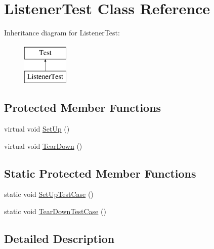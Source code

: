 \hypertarget{classtesting_1_1internal_1_1ListenerTest}{\section{\-Listener\-Test \-Class \-Reference}
\label{de/d9a/classtesting_1_1internal_1_1ListenerTest}
}
\-Inheritance diagram for \-Listener\-Test\-:\begin{figure}[H]
\begin{center}
\leavevmode
\includegraphics[height=2.000000cm]{de/d9a/classtesting_1_1internal_1_1ListenerTest}
\end{center}
\end{figure}
\subsection*{\-Protected \-Member \-Functions}
\begin{DoxyCompactItemize}
\item 
virtual void \hyperlink{classtesting_1_1internal_1_1ListenerTest_a901706a587f9ae84df8b2395fbe759cb}{\-Set\-Up} ()
\item 
virtual void \hyperlink{classtesting_1_1internal_1_1ListenerTest_a870a092058305911f3d42df45dd657e5}{\-Tear\-Down} ()
\end{DoxyCompactItemize}
\subsection*{\-Static \-Protected \-Member \-Functions}
\begin{DoxyCompactItemize}
\item 
static void \hyperlink{classtesting_1_1internal_1_1ListenerTest_aad8181b222f27240e9f07dcb6e620fa3}{\-Set\-Up\-Test\-Case} ()
\item 
static void \hyperlink{classtesting_1_1internal_1_1ListenerTest_aaff0dc66f57f643a49ad3dd6bcb56916}{\-Tear\-Down\-Test\-Case} ()
\end{DoxyCompactItemize}


\subsection{\-Detailed \-Description}


